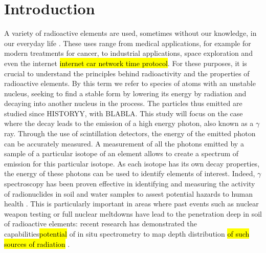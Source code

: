 \section{Introduction}
A variety of radioactive elements are used, sometimes without our knowledge, in our everyday life \cite{my_ass}.
These uses range from medical applications, for example for modern treatments for cancer, to industrial applications, space exploration and even the internet \hl{internet car network time protocol}.
For these purposes, it is crucial to understand the principles behind radioactivity and the properties of radioactive elements.
By this term we refer to species of atoms with an unstable nucleus, seeking to find a stable form by lowering its energy by radiation and decaying into another nucleus in the process.
The particles thus emitted are studied since HISTORYY, with BLABLA.
This study will focus on the case where the decay leads to the emission of a high energy photon, also known as a \(\gamma\) ray.
Through the use of scintillation detectors, the energy of the emitted photon can be accurately measured.
A measurement of all the photons emitted by a sample of a particular isotope of an element allows to create a spectrum of emission for this particular isotope.
As each isotope has its own decay properties, the energy of these photons can be used to identify elements of interest.
Indeed, $\gamma$ spectroscopy has been proven effective in identifying and measuring the activity of radionuclides in soil and water samples to assest potential hazards to human health \cite{ramadhany_assessment_2022} \cite{kim_design_2022}.
This is particularly important in areas where past events such as nuclear weapon testing or full nuclear meltdowns have lead to the penetration deep in soil of radioactive elements: 
recent research has demonstrated the capabilities\hl{potential} of in situ spectrometry to map depth distribution \hl{of such sources of radiation} \cite{varley_situ_2017}.
